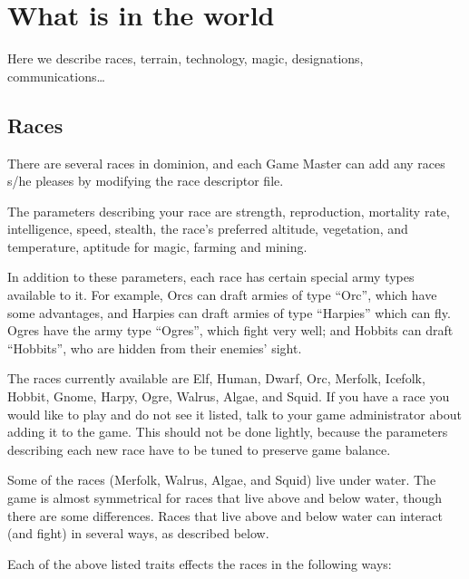 \chapter{What is in the world}

Here we describe races, terrain, technology, magic, designations,
communications\dots{}

\section{Races}
There are several races in dominion, and each Game Master can add any
races s/he pleases by modifying the race descriptor file.

The parameters describing your race are strength, reproduction,
mortality rate, intelligence, speed, stealth, the race's preferred
altitude, vegetation, and temperature, aptitude for magic, farming and
mining.

In addition to these parameters, each race has certain special army
types available to it.  For example, Orcs can draft armies of type
``Orc'', which have some advantages, and Harpies can draft armies of
type ``Harpies'' which can fly.  Ogres have the army type ``Ogres'',
which fight very well; and Hobbits can draft ``Hobbits'', who are
hidden from their enemies' sight.

The races currently available are Elf, Human, Dwarf, Orc, Merfolk,
Icefolk, Hobbit, Gnome, Harpy, Ogre, Walrus, Algae, and Squid.  If you have a
race you would like to play and do not see it listed, talk to your
game administrator about adding it to the game.  This should not be
done lightly, because the parameters describing each new race have to
be tuned to preserve game balance.

Some of the races (Merfolk, Walrus, Algae, and Squid) live under water.  The
game is almost symmetrical for races that live above and below water,
though there are some differences.  Races that live above and below
water can interact (and fight) in several ways, as described below.

Each of the above listed traits effects the races in the following ways:

